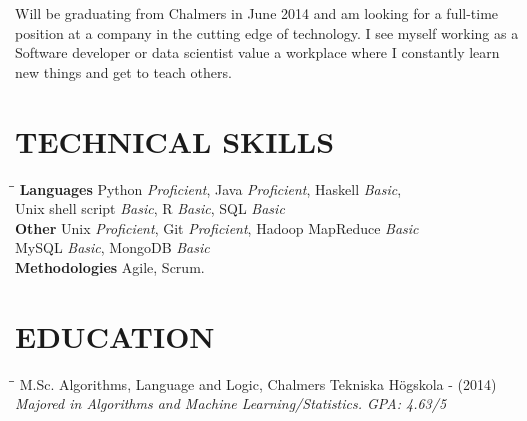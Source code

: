 \documentclass[11pt]{res}
\begin{document}
 
$\:$ \\
\begin{resume}

Will be graduating from Chalmers in June 2014 and am looking for a full-time position at a company in the cutting edge of technology. I see myself working as a Software developer or data scientist value a workplace where I constantly learn new things and get to teach others.

\section{TECHNICAL SKILLS}          
\vspace{-0.1in}	
	\begin{tabbing}
		\hspace{2.3in}\= \hspace{2.6in}\= \kill %
		{\bf Languages} 
\> Python { \small\textit{Proficient}}, Java { \small\textit{Proficient}}, Haskell {\small\textit{Basic}}, \\ 
\> Unix shell script { \small\textit{Basic}}, R { \small\textit{Basic}}, SQL { \small\textit{Basic}} \\
		{\bf Other} 
\> Unix { \small\textit{Proficient}}, Git { \small\textit{Proficient}}, Hadoop MapReduce { \small\textit{Basic}} \\
\> MySQL { \small\textit{Basic}}, MongoDB { \small\textit{Basic}} \\
		{\bf Methodologies} 
\> Agile, Scrum. 


	\end{tabbing}       

\section{EDUCATION}          
\vspace{-0.1in}	

	\begin{tabbing}
		\hspace{2.3in}\= \hspace{2.6in}\= \kill
		    M.Sc. Algorithms, Language and Logic, Chalmers Tekniska Högskola  \>  - (2014)\\
\textit{Majored in Algorithms and Machine Learning/Statistics. GPA: 4.63/5}  \\   
	\end{tabbing}


\end{resume}
\end{document}
